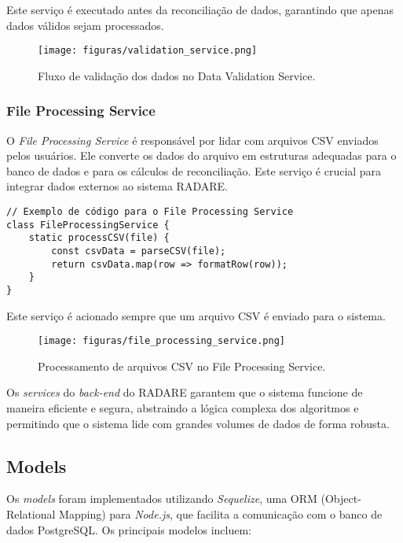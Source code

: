 Este serviço é executado antes da reconciliação de dados, garantindo que apenas dados válidos sejam processados.

\begin{figure}[htbp]
    \centering
    \texttt{[image: figuras/validation\_service.png]}
    \caption{Fluxo de validação dos dados no Data Validation Service.}
    \label{Fig:ValidationService}
\end{figure}

\subsubsection{File Processing Service}

O \textit{File Processing Service} é responsável por lidar com arquivos CSV enviados pelos usuários. Ele converte os dados do arquivo em estruturas adequadas para o banco de dados e para os cálculos de reconciliação. Este serviço é crucial para integrar dados externos ao sistema RADARE.

\begin{verbatim}
// Exemplo de código para o File Processing Service
class FileProcessingService {
    static processCSV(file) {
        const csvData = parseCSV(file);
        return csvData.map(row => formatRow(row));
    }
}
\end{verbatim}

Este serviço é acionado sempre que um arquivo CSV é enviado para o sistema.

\begin{figure}[htbp]
    \centering
    \texttt{[image: figuras/file\_processing\_service.png]}
    \caption{Processamento de arquivos CSV no File Processing Service.}
    \label{Fig:FileProcessingService}
\end{figure}

Os \textit{services} do \textit{back-end} do RADARE garantem que o sistema funcione de maneira eficiente e segura, abstraindo a lógica complexa dos algoritmos e permitindo que o sistema lide com grandes volumes de dados de forma robusta.


\subsection{Models}

Os \textit{models} foram implementados utilizando \textit{Sequelize}, uma ORM (Object-Relational Mapping) para \textit{Node.js}, que facilita a comunicação com o banco de dados PostgreSQL. Os principais modelos incluem:

